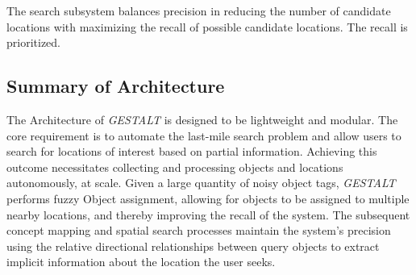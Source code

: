 The search subsystem balances precision in reducing the number of candidate locations with maximizing the recall of possible candidate locations. The recall is prioritized.

\subsection{Summary of Architecture}
The Architecture of \textit{GESTALT} is designed to be lightweight and modular. The core requirement is to automate the last-mile search problem and allow users to search for locations of interest based on partial information. 
Achieving this outcome necessitates collecting and processing objects and locations autonomously, at scale.
Given a large quantity of noisy object tags, \emph{GESTALT} performs fuzzy Object assignment, allowing for objects to be assigned to multiple nearby locations, and thereby improving the recall of the system.
The subsequent concept mapping and spatial search processes maintain the system's precision using the relative directional relationships between query objects to extract implicit information about the location the user seeks. 